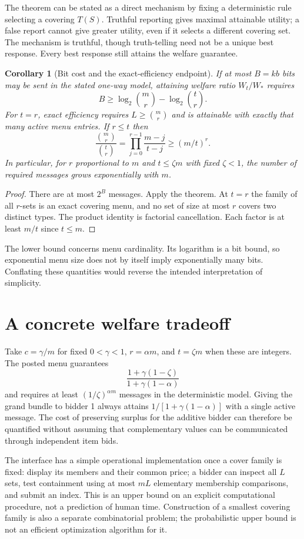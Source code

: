 \documentclass[11pt,a4paper]{article}
\newtheorem{corollary}[theorem]{Corollary}
\theoremstyle{remark}
\begin{document}
The theorem can be stated as a direct mechanism by fixing a deterministic rule selecting a covering $T(S)$. Truthful reporting gives maximal attainable utility; a false report cannot give greater utility, even if it selects a different covering set. The mechanism is truthful, though truth-telling need not be a unique best response. Every best response still attains the welfare guarantee.

\begin{corollary}[Bit cost and the exact-efficiency endpoint]
If at most $B=kb$ bits may be sent in the stated one-way model, attaining welfare ratio $W_t/W_*$ requires
\[
 B\ge\log_2\binom mr-\log_2\binom tr.
\]
For $t=r$, exact efficiency requires $L\ge\binom mr$ and is attainable with exactly that many active menu entries. If $r\le t$ then
\[
 \frac{\binom mr}{\binom tr}
 =\prod_{j=0}^{r-1}\frac{m-j}{t-j}\ge(m/t)^r.
\]
In particular, for $r$ proportional to $m$ and $t\le\zeta m$ with fixed $\zeta<1$, the number of required messages grows exponentially with $m$.
\end{corollary}
\begin{proof}
There are at most $2^B$ messages. Apply the theorem. At $t=r$ the family of all $r$-sets is an exact covering menu, and no set of size at most $r$ covers two distinct types. The product identity is factorial cancellation. Each factor is at least $m/t$ since $t\le m$.
\end{proof}

The lower bound concerns menu cardinality. Its logarithm is a bit bound, so exponential menu size does not by itself imply exponentially many bits. Conflating these quantities would reverse the intended interpretation of simplicity.

\section{A concrete welfare tradeoff}
Take $c=\gamma/m$ for fixed $0<\gamma<1$, $r=\alpha m$, and $t=\zeta m$ when these are integers. The posted menu guarantees
\[
 \frac{1+\gamma(1-\zeta)}{1+\gamma(1-\alpha)}
\]
and requires at least $(1/\zeta)^{\alpha m}$ messages in the deterministic model. Giving the grand bundle to bidder 1 always attains $1/[1+\gamma(1-\alpha)]$ with a single active message. The cost of preserving surplus for the additive bidder can therefore be quantified without assuming that complementary values can be communicated through independent item bids.

The interface has a simple operational implementation once a cover family is fixed: display its members and their common price; a bidder can inspect all $L$ sets, test containment using at most $mL$ elementary membership comparisons, and submit an index. This is an upper bound on an explicit computational procedure, not a prediction of human time. Construction of a smallest covering family is also a separate combinatorial problem; the probabilistic upper bound is not an efficient optimization algorithm for it.
\end{document}
